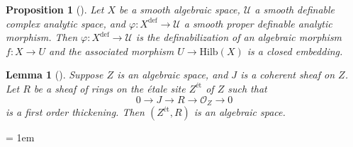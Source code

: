 \documentclass{amsart}
\newtheorem{lemma}[theorem]{Lemma}
\newtheorem{proposition}[theorem]{Proposition}
\theoremstyle{definition}
\numberwithin{equation}{section}
\newcommand{\definable}{\mathrm{def}}
\begin{document}
\begin{proposition}[{\cite[Proposition 4.6]{zbMATH07662555}}]
    Let $X$ be a smooth algebraic space,
    $\mathcal{U}$ a smooth definable complex analytic space,
    and $\varphi: X^{\definable} \to \mathcal{U}$ a smooth proper definable analytic morphism.
    Then $\varphi: X^{\definable} \to \mathcal{U}$ is the definabilization of an algebraic morphism $f: X \to U$ and 
    the associated morphism $U \to \mathrm{Hilb}(X)$ is a closed embedding.
\end{proposition}

\begin{lemma}[{\cite[Lemma 4.11]{zbMATH07662555}}]
    Suppose $Z$ is an algebraic space,
    and $J$ is a coherent sheaf on $Z$.
    Let $R$ be a sheaf of rings on the {\'e}tale site $Z^{\text{\' et}}$ of $Z$ such that 
    \[
    0 \to J \to R \to \mathcal{O}_Z \to 0
    \]
    is a first order thickening.
    Then $(Z^{\text{\'et}},R)$ is an algebraic space.
\end{lemma}

\emergencystretch = 1em
\printbibliography
\end{document}

